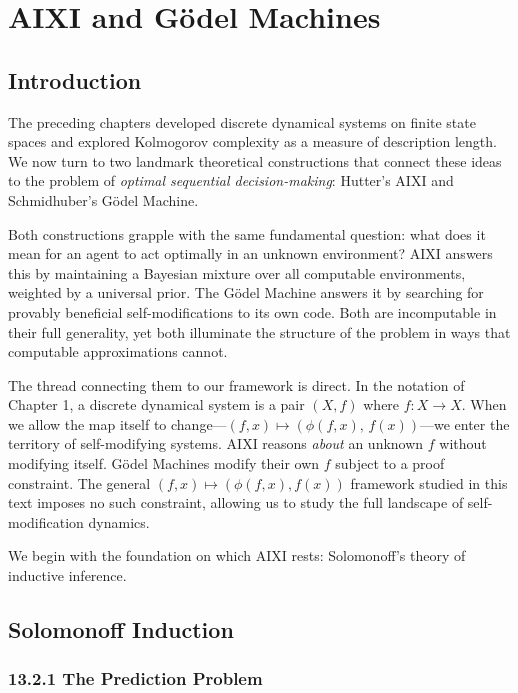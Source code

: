 \chapter{AIXI and Gödel Machines}

\section{Introduction}

The preceding chapters developed discrete dynamical systems on finite state spaces and explored Kolmogorov complexity as a measure of description length. We now turn to two landmark theoretical constructions that connect these ideas to the problem of \textit{optimal sequential decision-making}: Hutter's AIXI and Schmidhuber's Gödel Machine.

Both constructions grapple with the same fundamental question: what does it mean for an agent to act optimally in an unknown environment? AIXI answers this by maintaining a Bayesian mixture over all computable environments, weighted by a universal prior. The Gödel Machine answers it by searching for provably beneficial self-modifications to its own code. Both are incomputable in their full generality, yet both illuminate the structure of the problem in ways that computable approximations cannot.

The thread connecting them to our framework is direct. In the notation of Chapter 1, a discrete dynamical system is a pair $(X, f)$ where $f: X \to X$. When we allow the map itself to change---$(f, x) \mapsto (\phi(f, x),\, f(x))$---we enter the territory of self-modifying systems. AIXI reasons \textit{about} an unknown $f$ without modifying itself. Gödel Machines modify their own $f$ subject to a proof constraint. The general $(f, x) \mapsto (\phi(f,x), f(x))$ framework studied in this text imposes no such constraint, allowing us to study the full landscape of self-modification dynamics.

We begin with the foundation on which AIXI rests: Solomonoff's theory of inductive inference.



\section{Solomonoff Induction}

\subsection{13.2.1 The Prediction Problem}


